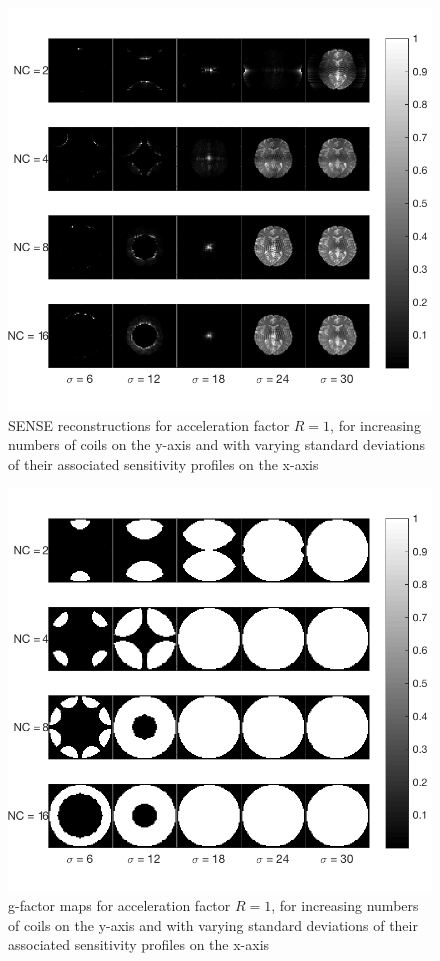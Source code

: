\begin{figure}[H]
    \centering
    \includegraphics[width=1\textwidth,keepaspectratio]{R1brainsb}
    \caption{SENSE reconstructions for acceleration factor $R = 1$, for increasing numbers of coils on the y-axis and with varying standard deviations of their associated sensitivity profiles on the x-axis}
    \label{fig:R1brains}
\end{figure}

\begin{figure}[H]
    \centering
    \includegraphics[width=1\textwidth,keepaspectratio]{R1gfactb}
    \caption{g-factor maps for acceleration factor $R = 1$, for increasing numbers of coils on the y-axis and with varying standard deviations of their associated sensitivity profiles on the x-axis}
    \label{fig:R1gfact}
\end{figure}

